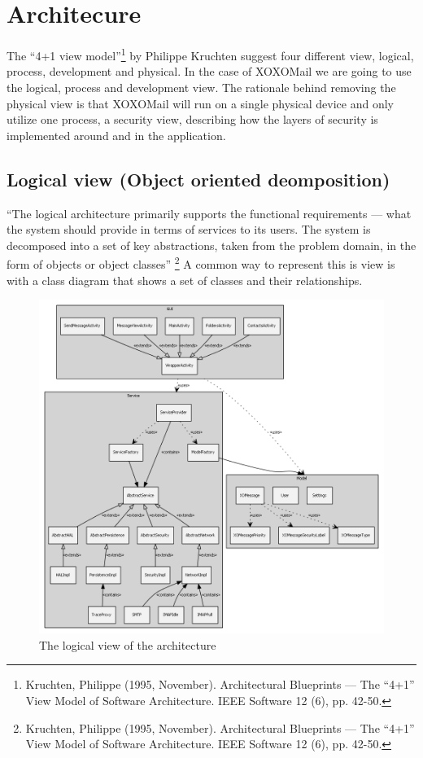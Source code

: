 \section{Architecure}
The “4+1 view model”\footnote{Kruchten, Philippe (1995, November). Architectural Blueprints — The “4+1” View Model of Software Architecture. IEEE Software 12 (6), pp. 42-50.} by Philippe Kruchten suggest four different view, logical, process, development and physical. In the case of XOXOMail we are going to use the logical, process and development view. The rationale behind removing the physical view is that XOXOMail will run on a single physical device and only utilize one process, a security view, describing how the layers of security is implemented around and in the application.

\subsection{Logical view (Object oriented deomposition)}
“The logical architecture primarily supports the functional requirements --- what the system should provide in terms of services to its users. The system is decomposed into a set of key abstractions, taken from the problem domain, in the form of objects or object classes” \footnote{Kruchten, Philippe (1995, November). Architectural Blueprints — The “4+1” View Model of Software Architecture. IEEE Software 12 (6), pp. 42-50.} A common way to represent this is view is with a class diagram that shows a set of classes and their relationships.

\begin{figure}
	\includegraphics[width=\textwidth]{logicalview.png}
	\caption{The logical view of the architecture}
	\label{fig:logicalview}
\end{figure}

